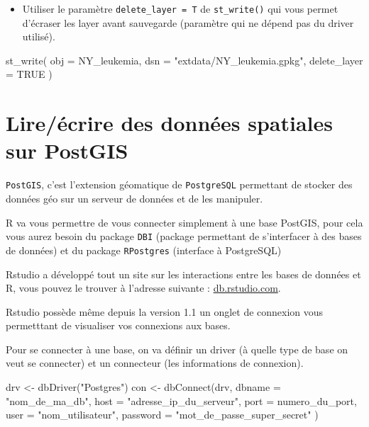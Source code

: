 \documentclass[
]{book}
\newenvironment{Shaded}{\begin{snugshade}}{\end{snugshade}}
\newcommand{\AttributeTok}[1]{\textcolor[rgb]{0.77,0.63,0.00}{#1}}
\newcommand{\ConstantTok}[1]{\textcolor[rgb]{0.00,0.00,0.00}{#1}}
\newcommand{\FunctionTok}[1]{\textcolor[rgb]{0.00,0.00,0.00}{#1}}
\newcommand{\NormalTok}[1]{#1}
\newcommand{\OtherTok}[1]{\textcolor[rgb]{0.56,0.35,0.01}{#1}}
\newcommand{\StringTok}[1]{\textcolor[rgb]{0.31,0.60,0.02}{#1}}
\providecommand{\tightlist}{%
  \setlength{\itemsep}{0pt}\setlength{\parskip}{0pt}}
\begin{document}
\begin{itemize}
\tightlist
\item
  Utiliser le paramètre \texttt{delete\_layer\ =\ T} de \texttt{st\_write()} qui vous permet d'écraser les layer avant sauvegarde (paramètre qui ne dépend pas du driver utilisé).
\end{itemize}

\begin{Shaded}
\begin{Highlighting}[]
\FunctionTok{st\_write}\NormalTok{(}
  \AttributeTok{obj =}\NormalTok{ NY\_leukemia,}
  \AttributeTok{dsn =} \StringTok{"extdata/NY\_leukemia.gpkg"}\NormalTok{,}
  \AttributeTok{delete\_layer =} \ConstantTok{TRUE}
\NormalTok{)}
\end{Highlighting}
\end{Shaded}

\hypertarget{lireuxe9crire-des-donnuxe9es-spatiales-sur-postgis}{%
\section{Lire/écrire des données spatiales sur PostGIS}\label{lireuxe9crire-des-donnuxe9es-spatiales-sur-postgis}}

\texttt{PostGIS}, c'est l'extension géomatique de \texttt{PostgreSQL} permettant de stocker des données géo sur un serveur de données et de les manipuler.

R va vous permettre de vous connecter simplement à une base PostGIS, pour cela vous aurez besoin du package \texttt{DBI} (package permettant de s'interfacer à des bases de données) et du package \texttt{RPostgres} (interface à PostgreSQL)

Rstudio a développé tout un site sur les interactions entre les bases de données et R, vous pouvez le trouver à l'adresse suivante : \href{https://db.rstudio.com/}{db.rstudio.com}.

Rstudio possède même depuis la version 1.1 un onglet de connexion vous permetttant de visualiser vos connexions aux bases.

Pour se connecter à une base, on va définir un driver (à quelle type de base on veut se connecter) et un connecteur (les informations de connexion).

\begin{Shaded}
\begin{Highlighting}[]
\NormalTok{drv }\OtherTok{\textless{}{-}} \FunctionTok{dbDriver}\NormalTok{(}\StringTok{"Postgres"}\NormalTok{)}
\NormalTok{con }\OtherTok{\textless{}{-}} \FunctionTok{dbConnect}\NormalTok{(drv,}
  \AttributeTok{dbname =} \StringTok{"nom\_de\_ma\_db"}\NormalTok{,}
  \AttributeTok{host =} \StringTok{"adresse\_ip\_du\_serveur"}\NormalTok{,}
  \AttributeTok{port =}\NormalTok{ numero\_du\_port,}
  \AttributeTok{user =} \StringTok{"nom\_utilisateur"}\NormalTok{,}
  \AttributeTok{password =} \StringTok{"mot\_de\_passe\_super\_secret"}
\NormalTok{)}
\end{Highlighting}
\end{Shaded}
\end{document}
